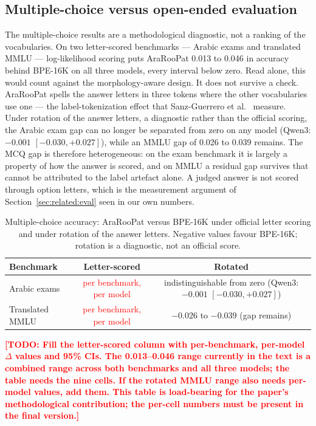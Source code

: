 \documentclass[a4paper,fleqn]{cas-sc}
\newcommand{\todo}[1]{\textcolor{red}{\textbf{[\textsc{TODO}: #1]}}}
\begin{document}
\subsection{Multiple-choice versus open-ended evaluation}
\label{sec:results:mcq}

The multiple-choice results are a methodological diagnostic, not a ranking of the vocabularies. On two letter-scored benchmarks --- Arabic exams and translated MMLU --- log-likelihood scoring puts AraRooPat 0.013 to 0.046 in accuracy behind BPE-16K on all three models, every interval below zero. Read alone, this would count against the morphology-aware design. It does not survive a check. AraRooPat spells the answer letters in three tokens where the other vocabularies use one --- the label-tokenization effect that Sanz-Guerrero et al.\ \citep{sanzguerrero2025mind} measure. Under rotation of the answer letters, a diagnostic rather than the official scoring, the Arabic exam gap can no longer be separated from zero on any model (Qwen3: $-0.001$ $[-0.030,+0.027]$), while an MMLU gap of 0.026 to 0.039 remains. The MCQ gap is therefore heterogeneous: on the exam benchmark it is largely a property of how the answer is scored, and on MMLU a residual gap survives that cannot be attributed to the label artefact alone. A judged answer is not scored through option letters, which is the measurement argument of Section~\ref{sec:related:eval} seen in our own numbers.

\begin{table}[t]
\centering
\caption{Multiple-choice accuracy: AraRooPat versus BPE-16K under official letter scoring and under rotation of the answer letters. Negative values favour BPE-16K; rotation is a diagnostic, not an official score.}
\label{tab:mcq}
\begin{tabular}{@{}lcc@{}}
\toprule
Benchmark & Letter-scored & Rotated \\
\midrule
Arabic exams & \textcolor{red}{per benchmark, per model} & indistinguishable from zero (Qwen3: $-0.001$ $[-0.030,+0.027]$) \\
Translated MMLU & \textcolor{red}{per benchmark, per model} & $-0.026$ to $-0.039$ (gap remains) \\
\bottomrule
\end{tabular}
\vspace{2pt}
\raggedright\footnotesize
\todo{Fill the letter-scored column with per-benchmark, per-model $\Delta$ values and 95\% CIs. The 0.013--0.046 range currently in the text is a combined range across both benchmarks and all three models; the table needs the nine cells. If the rotated MMLU range also needs per-model values, add them. This table is load-bearing for the paper's methodological contribution; the per-cell numbers must be present in the final version.}
\end{table}
\end{document}
